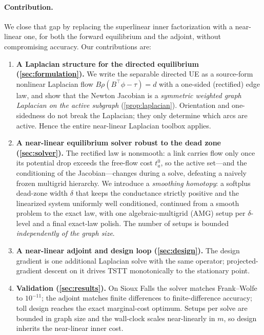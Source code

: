 \documentclass[ijoc]{informs3}
\begin{document}
\paragraph{Contribution.}
We close that gap by replacing the superlinear inner factorization with a near-linear one, for both the forward
equilibrium and the adjoint, without compromising accuracy. Our contributions are:
\begin{enumerate}[leftmargin=*]
\item \textbf{A Laplacian structure for the directed equilibrium (\cref{sec:formulation}).} We write the
separable directed UE as a source-form nonlinear Laplacian flow $B\rho(B^\top\phi-\tau)=d$ with a one-sided
(rectified) edge law, and show that the Newton Jacobian is a \emph{symmetric weighted graph Laplacian on the
active subgraph} (\cref{prop:laplacian}). Orientation and one-sidedness do not break the Laplacian; they only
determine which arcs are active. Hence the entire near-linear Laplacian toolbox applies.
\item \textbf{A near-linear equilibrium solver robust to the dead zone (\cref{sec:solver}).} The rectified law
is nonsmooth: a link carries flow only once its potential drop exceeds the free-flow cost $t^0_a$, so the active
set---and the conditioning of the Jacobian---changes during a solve, defeating a naively frozen multigrid
hierarchy. We introduce a \emph{smoothing homotopy}: a softplus dead-zone width $\delta$ that keeps the
conductance strictly positive and the linearized system uniformly well conditioned, continued from a smooth
problem to the exact law, with one algebraic-multigrid (AMG) setup per $\delta$-level and a final exact-law
polish. The number of setups is bounded \emph{independently of the graph size}.
\item \textbf{A near-linear adjoint and design loop (\cref{sec:design}).} The design gradient is one additional
Laplacian solve with the same operator; projected-gradient descent on it drives TSTT monotonically to the
stationary point.
\item \textbf{Validation (\cref{sec:results}).} On Sioux Falls the solver matches Frank--Wolfe to $10^{-11}$;
the adjoint matches finite differences to finite-difference accuracy; toll design reaches the exact
marginal-cost optimum. Setups per solve are bounded in graph size and the wall-clock scales near-linearly in
$m$, so design inherits the near-linear inner cost.
\end{enumerate}
\end{document}
